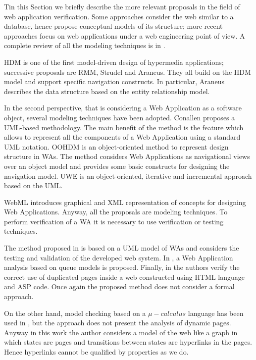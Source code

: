 Tin this Section we briefly describe the more relevant proposals in the field of web application verification.
Some approaches consider the web similar to a database, hence propose conceptual models of its structure; more recent approaches focus on web applications under a web engineering point of view. A complete review of all the modeling techniques is in \cite{fraternali-99}.

HDM \cite{gar-pao-93} is one of the first model-driven design of hypermedia applications; successive proposals are RMM\cite{isa-sto-95}, Strudel \cite{fer-98} and Araneus\cite{atz-mec-mer-98}. They all build on the HDM model and support specific navigation constructs. In particular, Araneus describes the data structure based on the entity relationship model.  

In the second perspective, that is considering a Web Application as a software object, several modeling techniques have been adopted. Conallen \cite{cona-02} proposes a UML-based methodology. The main benefit of the method is the feature which allows to represent all the components of a Web Application using a standard UML notation. OOHDM \cite{ros-sch-02} is an object-oriented method to represent design structure in WAs. The method considers Web Applications as navigational views over an object model and provides some basic constructs for designing the navigation model. UWE \cite{koch-kraus-02} is an object-oriented, iterative and incremental approach based on the UML. 
 
WebML \cite{cer-fra-mat-02} introduces graphical and XML representation of concepts for designing Web Applications. Anyway, all the proposals are modeling techniques. To perform verification of a WA it is necessary to use verification or testing techniques. 

The method proposed in \cite{ric-ton-02} is based on a UML model of WAs and considers the testing and validation of the developed web system. In \cite{antoniol}, a Web Application analysis based on queue models is proposed. Finally, in \cite{dilucca} the authors verify the correct use of duplicated pages inside a web constructed using HTML language and ASP code. Once again the proposed method does not consider a formal approach.

On the other hand, model checking based on a $\mu-calculus$ language has been used in \cite{de-alfaro-01}, but the approach does not present the analysis of dynamic pages. Anyway in this work the author considers a model of the web like a graph in which states are pages and transitions between states are hyperlinks in the pages. Hence hyperlinks cannot be qualified by properties as we do.

